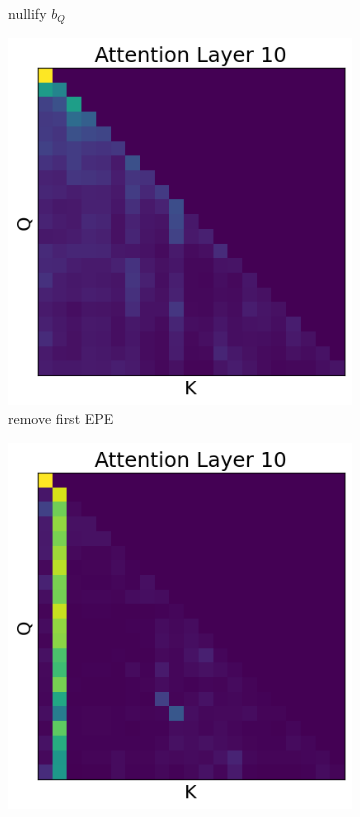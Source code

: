\documentclass[11pt]{article}
\begin{document}
\begin{figure}[t!]
\begin{subfigure}[t]{0.22\textwidth}
    \caption{ nullify $b_Q$}
    \label{fig:intervention1}
  \end{subfigure}
  \begin{subfigure}[t]{0.22\textwidth}
    \centering
    \includegraphics[width=0.85\columnwidth]{figures/obs4_intervention2.png}
    \caption{remove first EPE}
    \label{fig:intervention2}
  \end{subfigure}
  \begin{subfigure}[t]{0.22\textwidth}
    \centering
    \includegraphics[width=0.85\columnwidth]{figures/obs4_intervention3.png}

\end{subfigure}
\end{figure}
\end{document}
